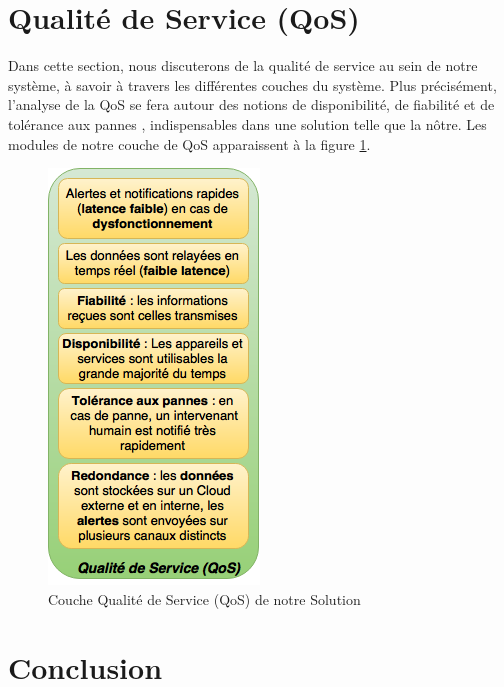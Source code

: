 \documentclass{article}
\begin{document}
\section{Qualité de Service (QoS)}
Dans cette section, nous discuterons de la qualité de service au sein de notre système, à savoir à travers les différentes couches du système. Plus précisément, l'analyse de la QoS se fera autour des notions de disponibilité, de fiabilité et de tolérance aux pannes \cite{gia2015fault}, indispensables dans une solution telle que la nôtre. Les modules de notre couche de QoS apparaissent à la figure \ref{qos}.
\newline
\begin{figure}[h!]
	\centering
	\includegraphics[width=0.5\textwidth]{qos.png}
	\caption{Couche Qualité de Service (QoS) de notre Solution}
	\label{qos}
\end{figure}



\section{Conclusion}










\end{document}
